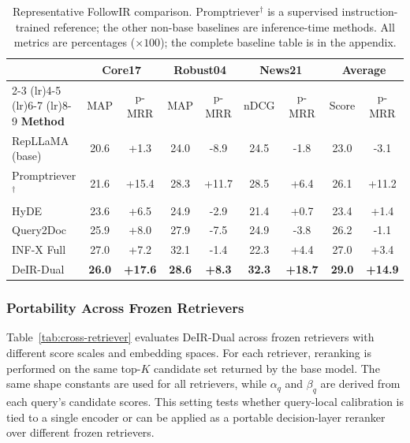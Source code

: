 \documentclass[letterpaper]{article}
\newcommand{\method}{DeIR-Dual}
\begin{document}
\begin{table}[!t]
\centering
\small
\begin{tabular}{l|cc|cc|cc|cc}
\toprule
& \multicolumn{2}{c|}{Core17} & \multicolumn{2}{c|}{Robust04} & \multicolumn{2}{c|}{News21} & \multicolumn{2}{c}{Average} \\
\cmidrule(lr){2-3} \cmidrule(lr){4-5} \cmidrule(lr){6-7} \cmidrule(lr){8-9}
\textbf{Method} & MAP & p-MRR & MAP & p-MRR & nDCG & p-MRR & Score & p-MRR \\
\midrule
RepLLaMA (base) & 20.6 & +1.3 & 24.0 & -8.9 & 24.5 & -1.8 & 23.0 & -3.1 \\
Promptriever$^{\dagger}$ & 21.6 & +15.4 & 28.3 & +11.7 & 28.5 & +6.4 & 26.1 & +11.2 \\
\midrule
HyDE & 23.6 & +6.5 & 24.9 & -2.9 & 21.4 & +0.7 & 23.4 & +1.4 \\
Query2Doc & 25.9 & +8.0 & 27.9 & -7.5 & 24.9 & -3.8 & 26.2 & -1.1 \\
INF-X Full & 27.0 & +7.2 & 32.1 & -1.4 & 22.3 & +4.4 & 27.0 & +3.4 \\
\midrule
DeIR-Dual & \textbf{26.0} & \textbf{+17.6} & \textbf{28.6} & \textbf{+8.3} & \textbf{32.3} & \textbf{+18.7} & \textbf{29.0} & \textbf{+14.9} \\
\bottomrule
\end{tabular}
\caption{Representative FollowIR comparison.  Promptriever$^{\dagger}$
  is a supervised instruction-trained reference; the other non-base
  baselines are inference-time methods.  All metrics are percentages
  ($\times 100$); the complete baseline table is in the appendix.}
\label{tab:followir-main}
\end{table}

\subsubsection{Portability Across Frozen Retrievers}
\label{sec:cross-retriever-main}

Table~\ref{tab:cross-retriever} evaluates \method{} across frozen
retrievers with different score scales and embedding spaces.  For each
retriever, reranking is performed on the same top-$K$ candidate set
returned by the base model.  The same shape constants are used for all
retrievers, while $\alpha_q$ and $\beta_q$ are derived from each
query's candidate scores.  This setting tests whether query-local
calibration is tied to a single encoder or can be applied as a portable
decision-layer reranker over different frozen retrievers.
\end{document}
